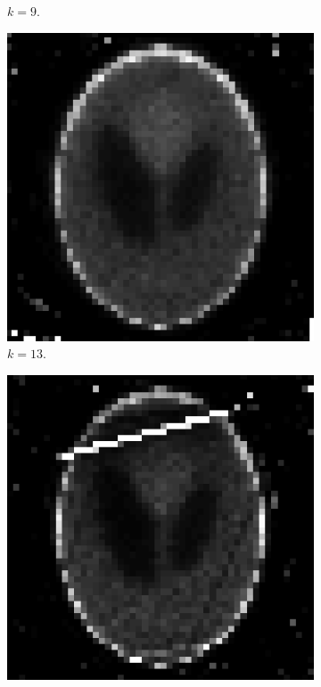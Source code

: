 \documentclass[letterpaper,12pt]{article}
\theoremstyle{plain}
\begin{document}
\begin{figure}[H]
\begin{subfigure}[h]{0.32\linewidth}
         \caption{$k=9$.}
         \label{fig:k9}
        \end{subfigure}
        \begin{subfigure}[h]{0.32\linewidth}
         \centering
         \includegraphics[width=\textwidth]{Figuras/em_k=13.png}
         \caption{$k=13$.}
         \label{fig:k13}
        \end{subfigure}
        \begin{subfigure}[h]{0.32\linewidth}
         \centering
         \includegraphics[width=\textwidth]{Figuras/em_k=20.png}

\end{subfigure}
\end{figure}
\end{document}
